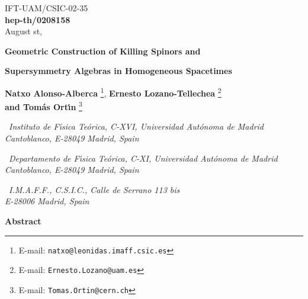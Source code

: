 \documentclass[12pt,a4paper]{article}
\begin{document}
\begin{flushright}
\small
IFT-UAM/CSIC-02-35\\
{\bf hep-th/0208158}\\
August \coordHE{}st, \coordHE{}
\normalsize
\end{flushright}

\begin{center}


\vspace{2cm}

{\Large {\bf Geometric Construction of Killing Spinors and}}

\vspace{.5cm}

{\Large {\bf Supersymmetry Algebras in Homogeneous Spacetimes}}

\vspace{2cm}

{\bf\large Natxo Alonso-Alberca}\myHighlight{${}^{\spadesuit\heartsuit}$}\coordHE{}
\footnote{E-mail: {\tt natxo@leonidas.imaff.csic.es}},
{\bf\large Ernesto Lozano-Tellechea}\myHighlight{${}^{\spadesuit\heartsuit}$}\coordHE{}
\footnote{E-mail: {\tt Ernesto.Lozano@uam.es}}\\
{\bf\large and Tom{\'a}s Ort\'{\i}n}\myHighlight{${}^{\spadesuit\clubsuit}$}\coordHE{}
\footnote{E-mail: {\tt Tomas.Ortin@cern.ch}}

\vspace{1cm}

\myHighlight{${}^{\spadesuit}$}\coordHE{}\ {\it Instituto de F\'{\i}sica Te{\'o}rica, C-XVI,
Universidad Aut{\'o}noma de Madrid\\
Cantoblanco, E-28049 Madrid, Spain}

\vskip 0.2cm
\myHighlight{${}^{\heartsuit}$}\coordHE{}\ {\it Departamento de F\'{\i}sica Te{\'o}rica, C-XI,
Universidad Aut{\'o}noma de Madrid\\
Cantoblanco, E-28049 Madrid, Spain}

\vskip 0.2cm
\myHighlight{${}^{\clubsuit}$}\coordHE{}\ {\it I.M.A.F.F., C.S.I.C., 
Calle de Serrano 113 bis\\ 
E-28006 Madrid, Spain}
\vspace{.7cm}






{\bf Abstract}

\end{center}
\end{document}
